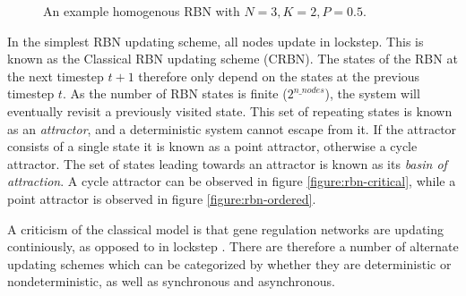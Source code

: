 \begin{figure}
  \centering
  \caption{An example homogenous RBN with $N=3, K=2, P=0.5$.}
  \label{figure:sample-homogenous-rbn}
\end{figure}

In the simplest RBN updating scheme, all nodes update in lockstep.
This is known as the Classical RBN updating scheme (CRBN).
The states of the RBN at the next timestep $t+1$ therefore only depend on the states at the previous timestep $t$.
As the number of RBN states is finite ($2^{n\_nodes}$),
the system will eventually revisit a previously visited state.
This set of repeating states is known as an \emph{attractor},
and a deterministic system cannot escape from it.
If the attractor consists of a single state it is known as a point attractor,
otherwise a cycle attractor.
The set of states leading towards an attractor is known as its \emph{basin of attraction}.
A cycle attractor can be observed in figure \ref{figure:rbn-critical},
while a point attractor is observed in figure \ref{figure:rbn-ordered}.

A criticism of the classical model is that gene regulation networks are updating continiously,
as opposed to in lockstep \cite{gershenson2004introduction}.
There are therefore a number of alternate updating schemes which can be categorized by whether they are deterministic or nondeterministic, as well as synchronous and asynchronous.

